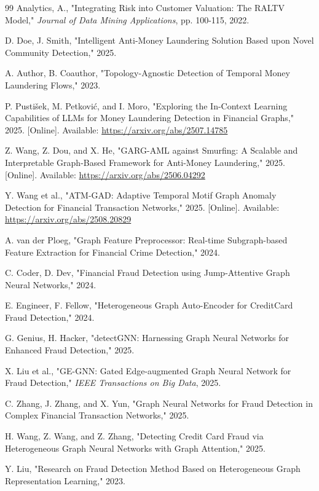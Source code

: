 \documentclass[lettersize,journal]{IEEEtran}
\begin{document}
\begin{thebibliography}{99}
Analytics, A., "Integrating Risk into Customer Valuation: The RALTV Model," \textit{Journal of Data Mining Applications}, pp. 100-115, 2022.

 D. Doe, J. Smith, "Intelligent Anti-Money Laundering Solution Based upon Novel Community Detection," 2025.

 A. Author, B. Coauthor, "Topology-Agnostic Detection of Temporal Money Laundering Flows," 2023.

 P. Pustišek, M. Petković, and I. Moro, "Exploring the In-Context Learning Capabilities of LLMs for Money Laundering Detection in Financial Graphs," 2025. [Online]. Available: \url{https://arxiv.org/abs/2507.14785}

 Z. Wang, Z. Dou, and X. He, "GARG-AML against Smurfing: A Scalable and Interpretable Graph-Based Framework for Anti-Money Laundering," 2025. [Online]. Available: \url{https://arxiv.org/abs/2506.04292}

 Y. Wang et al., "ATM-GAD: Adaptive Temporal Motif Graph Anomaly Detection for Financial Transaction Networks," 2025. [Online]. Available: \url{https://arxiv.org/abs/2508.20829}

 A. van der Ploeg, "Graph Feature Preprocessor: Real-time Subgraph-based Feature Extraction for Financial Crime Detection," 2024.

 C. Coder, D. Dev, "Financial Fraud Detection using Jump-Attentive Graph Neural Networks," 2024.

 E. Engineer, F. Fellow, "Heterogeneous Graph Auto-Encoder for CreditCard Fraud Detection," 2024.

 G. Genius, H. Hacker, "detectGNN: Harnessing Graph Neural Networks for Enhanced Fraud Detection," 2025.

 X. Liu et al., "GE-GNN: Gated Edge-augmented Graph Neural Network for Fraud Detection," \textit{IEEE Transactions on Big Data}, 2025.

 C. Zhang, J. Zhang, and X. Yun, "Graph Neural Networks for Fraud Detection in Complex Financial Transaction Networks," 2025.

 H. Wang, Z. Wang, and Z. Zhang, "Detecting Credit Card Fraud via Heterogeneous Graph Neural Networks with Graph Attention," 2025.

 Y. Liu, "Research on Fraud Detection Method Based on Heterogeneous Graph Representation Learning," 2023.


\end{thebibliography}
\end{document}
